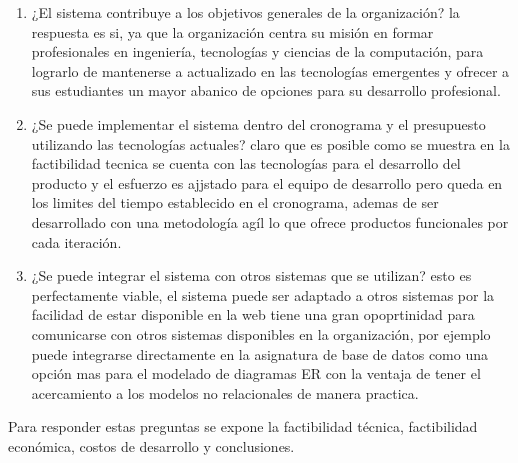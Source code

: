\begin{enumerate}
    \item ¿El sistema contribuye a los objetivos generales de la organización? la respuesta es si, ya que la organización centra su misión en formar profesionales en ingeniería, tecnologías y ciencias de la computación, para lograrlo de mantenerse a actualizado en las tecnologías emergentes y ofrecer a sus estudiantes un mayor abanico de opciones para su desarrollo profesional.
    \item ¿Se puede implementar el sistema dentro del cronograma y el presupuesto utilizando las tecnologías actuales? claro que es posible como se muestra en la factibilidad tecnica se cuenta con las tecnologías para el desarrollo del producto y el esfuerzo es ajjstado para el equipo de desarrollo pero queda en los limites del tiempo establecido en el cronograma, ademas de ser desarrollado con una metodología agíl lo que ofrece productos funcionales por cada iteración.
    \item ¿Se puede integrar el sistema con otros sistemas que se utilizan? esto es perfectamente viable, el sistema puede ser adaptado a otros sistemas por la facilidad de estar disponible en la web tiene una gran opoprtinidad para comunicarse con otros sistemas disponibles en la organización, por ejemplo puede integrarse directamente en la asignatura de base de datos como una opción mas para el modelado de diagramas ER con la ventaja de tener el acercamiento a los modelos no relacionales de manera practica.
\end{enumerate}


Para responder estas preguntas se expone la factibilidad técnica, factibilidad económica, costos de desarrollo y conclusiones.







